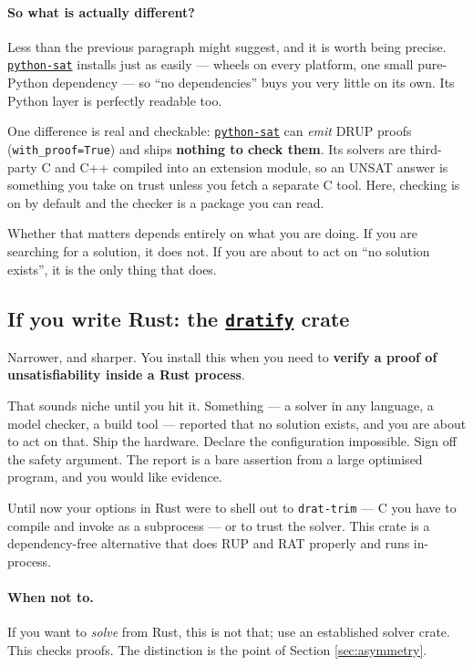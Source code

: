 \documentclass[11pt,a4paper]{article}
\newcommand{\pkg}[1]{\href{https://pypi.org/project/#1/}{\texttt{#1}}}
\begin{document}
\paragraph{So what is actually different?} Less than the previous paragraph
might suggest, and it is worth being precise. \pkg{python-sat} installs just as
easily --- wheels on every platform, one small pure-Python dependency --- so
``no dependencies'' buys you very little on its own. Its Python layer is
perfectly readable too.

One difference is real and checkable: \pkg{python-sat} can \emph{emit} DRUP
proofs (\texttt{with\_proof=True}) and ships \textbf{nothing to check them}. Its
solvers are third-party C and C++ compiled into an extension module, so an
UNSAT answer is something you take on trust unless you fetch a separate C tool.
Here, checking is on by default and the checker is a package you can read.

Whether that matters depends entirely on what you are doing. If you are
searching for a solution, it does not. If you are about to act on ``no solution
exists'', it is the only thing that does.

\subsection*{If you write Rust: the \pkg{dratify} crate}

Narrower, and sharper. You install this when you need to \textbf{verify a
proof of unsatisfiability inside a Rust process}.

That sounds niche until you hit it. Something --- a solver in any language, a
model checker, a build tool --- reported that no solution exists, and you are
about to act on that. Ship the hardware. Declare the configuration impossible.
Sign off the safety argument. The report is a bare assertion from a large
optimised program, and you would like evidence.

Until now your options in Rust were to shell out to \texttt{drat-trim} --- C
you have to compile and invoke as a subprocess --- or to trust the solver. This
crate is a dependency-free alternative that does RUP and RAT properly and runs
in-process.

\paragraph{When not to.} If you want to \emph{solve} from Rust, this is not
that; use an established solver crate. This checks proofs. The distinction is
the point of Section \ref{sec:asymmetry}.
\end{document}
